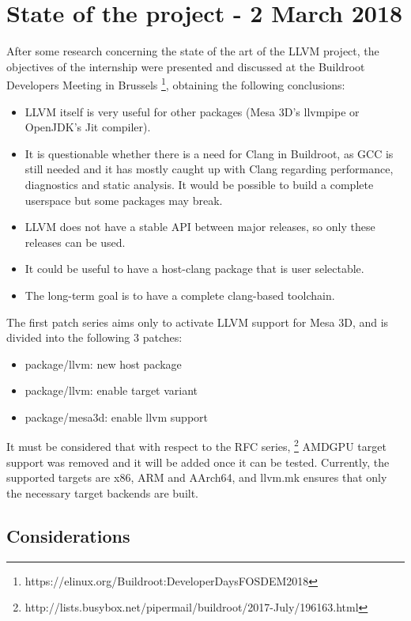 \documentclass[12pt,a4paper,oneside]{article}
\begin{document}
\section*{State of the project - 2 March 2018}
After some research concerning the state of the art of the LLVM project, the objectives
of the internship were presented and discussed at the Buildroot Developers Meeting
in Brussels \footnote{https://elinux.org/Buildroot:DeveloperDaysFOSDEM2018}, obtaining
the following conclusions:
\begin{itemize}
  \item LLVM itself is very useful for other packages (Mesa 3D's llvmpipe or OpenJDK's
        Jit compiler).
  \item It is questionable whether there is a need for Clang in Buildroot, as GCC
        is still needed and it has mostly caught up with Clang regarding performance,
        diagnostics and static analysis. It would be possible to build a complete
        userspace but some packages may break.
  \item LLVM does not have a stable API between major releases, so only these releases
        can be used.
  \item It could be useful to have a host-clang package that is user selectable.
  \item The long-term goal is to have a complete clang-based toolchain.
\end{itemize}
The first patch series aims only to activate LLVM support for Mesa 3D, and is divided
into the following 3 patches:
\begin{itemize}
  \item package/llvm: new host package
  \item package/llvm: enable target variant
  \item package/mesa3d: enable llvm support
\end{itemize}
It must be considered that with respect to the RFC series,
\footnote{http://lists.busybox.net/pipermail/buildroot/2017-July/196163.html}
AMDGPU target support was removed and it will be added once it can be tested.
Currently, the supported targets are x86, ARM and AArch64, and llvm.mk ensures
that only the necessary target backends are built.

\subsection*{Considerations}
\end{document}
